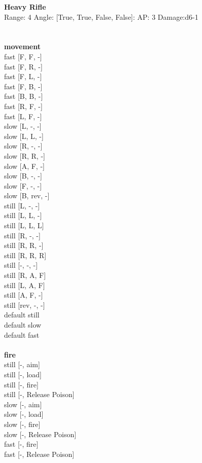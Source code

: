 {\bf Heavy Rifle } \\



Range: 4  Angle: [True, True, False, False]: AP: 3 Damage:d6-1 \\




 
\ \\



\ \\ {\bf movement } \\
fast [F, F, -] \\
fast [F, R, -] \\
fast [F, L, -] \\
fast [F, B, -] \\
fast [B, B, -] \\
fast [R, F, -] \\
fast [L, F, -] \\
slow [L, -, -] \\
slow [L, L, -] \\
slow [R, -, -] \\
slow [R, R, -] \\
slow [A, F, -] \\
slow [B, -, -] \\
slow [F, -, -] \\
slow [B, rev, -] \\
still [L, -, -] \\
still [L, L, -] \\
still [L, L, L] \\
still [R, -, -] \\
still [R, R, -] \\
still [R, R, R] \\
still [-, -, -] \\
still [R, A, F] \\
still [L, A, F] \\
still [A, F, -] \\
still [rev, -, -] \\
default still \\
default slow \\
default fast \\
\ \\ {\bf fire } \\
still [-, aim] \\
still [-, load] \\
still [-, fire] \\
still [-, Release Poison] \\
slow [-, aim] \\
slow [-, load] \\
slow [-, fire] \\
slow [-, Release Poison] \\
fast [-, fire] \\
fast [-, Release Poison] \\


